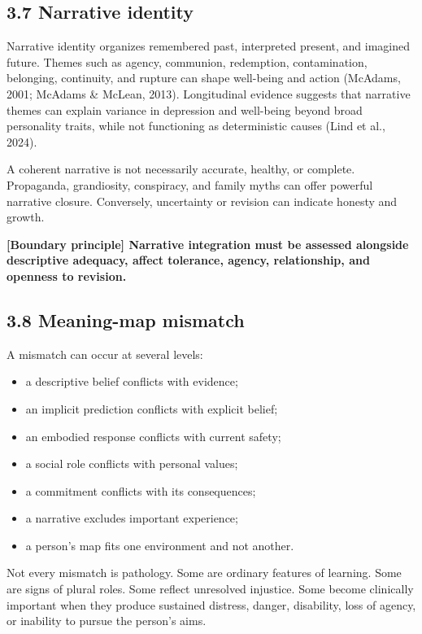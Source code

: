 \documentclass[
  11pt,
]{article}
\providecommand{\tightlist}{%
  \setlength{\itemsep}{0pt}\setlength{\parskip}{0pt}}
\begin{document}
\subsection{3.7 Narrative identity}\label{narrative-identity}

Narrative identity organizes remembered past, interpreted present, and
imagined future. Themes such as agency, communion, redemption,
contamination, belonging, continuity, and rupture can shape well-being
and action (McAdams, 2001; McAdams \& McLean, 2013). Longitudinal
evidence suggests that narrative themes can explain variance in
depression and well-being beyond broad personality traits, while not
functioning as deterministic causes (Lind et al., 2024).

A coherent narrative is not necessarily accurate, healthy, or complete.
Propaganda, grandiosity, conspiracy, and family myths can offer powerful
narrative closure. Conversely, uncertainty or revision can indicate
honesty and growth.

\textbf{{[}Boundary principle{]} Narrative integration must be assessed
alongside descriptive adequacy, affect tolerance, agency, relationship,
and openness to revision.}

\subsection{3.8 Meaning-map mismatch}\label{meaning-map-mismatch}

A mismatch can occur at several levels:

\begin{itemize}
\tightlist
\item
  a descriptive belief conflicts with evidence;
\item
  an implicit prediction conflicts with explicit belief;
\item
  an embodied response conflicts with current safety;
\item
  a social role conflicts with personal values;
\item
  a commitment conflicts with its consequences;
\item
  a narrative excludes important experience;
\item
  a person's map fits one environment and not another.
\end{itemize}

Not every mismatch is pathology. Some are ordinary features of learning.
Some are signs of plural roles. Some reflect unresolved injustice. Some
become clinically important when they produce sustained distress,
danger, disability, loss of agency, or inability to pursue the person's
aims.
\end{document}
